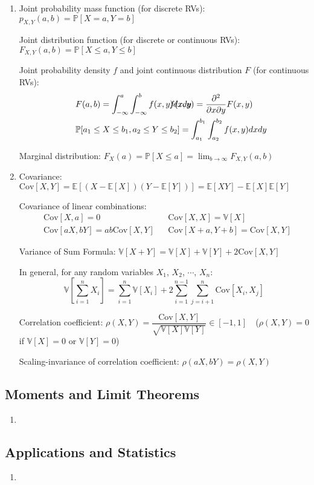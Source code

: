 \documentclass{article}
\begin{document}
\begin{enumerate}
		
	\item Joint probability mass function (for discrete RVs): $p_{X,Y}(a,b)=\mathbb{P}[X=a,Y=b]$
	
		Joint distribution function (for discrete or continuous RVs): $F_{X,Y}(a,b)=\mathbb{P}[X\leq a,Y\leq b]$
		
		Joint probability density $f$ and joint continuous distribution $F$ (for continuous RVs):
		\begin{align*}
			&F(a,b)=\int_{-\infty}^{a}\int_{-\infty}^{b}f(x,y)dxdy &&\hspace*{-4.4cm}f(x,y)=\frac{\partial^2}{\partial x\partial y}F(x,y) \\
			&\mathbb{P}[a_1\leq X\leq b_1, a_2\leq Y\leq b_2]=\int_{a_1}^{b_1}\int_{a_2}^{b_2}f(x,y)dxdy
		\end{align*}
		
		Marginal distribution: $F_X(a)=\mathbb{P}[X\leq a]=\displaystyle\lim_{b\to\infty}F_{X,Y}(a,b)$
	
	\item Covariance: $\mathrm{Cov}[X,Y]=\mathbb{E}\left[(X-\mathbb{E}[X])(Y-\mathbb{E}[Y])\right]=\mathbb{E}[XY]-\mathbb{E}[X]\mathbb{E}[Y]$
		
		Covariance of linear combinations:
		\begin{align*}
			&\mathrm{Cov}[X,a]=0 &&\mathrm{Cov}[X,X]=\mathbb{V}[X] \\
			&\mathrm{Cov}[aX,bY]=ab\mathrm{Cov}[X,Y] &&\mathrm{Cov}[X+a,Y+b]=\mathrm{Cov}[X,Y]
		\end{align*}
		
		Variance of Sum Formula: $\mathbb{V}[X+Y]=\mathbb{V}[X]+\mathbb{V}[Y]+2\mathrm{Cov}[X,Y]$
		
		In general, for any random variables $X_1$, $X_2$, $\cdots$, $X_n$:
		$$\mathbb{V}\left[\sum_{i=1}^{n}X_i\right]=\sum_{i=1}^{n}\mathbb{V}[X_i]+2\sum_{i=1}^{n-1}\sum_{j=i+1}
		^{n}\mathrm{Cov}[X_i,X_j]$$
		
		Correlation coefficient: $\rho(X,Y)=\dfrac{\mathrm{Cov}[X,Y]}{\sqrt{\mathbb{V}[X]\mathbb{V}[Y]}}\in[-1,1]$\ \ ($\rho(X,Y)=0$ if $\mathbb{V}[X]=0$ or $\mathbb{V}[Y]=0$)
		
		Scaling-invariance of correlation coefficient: $\rho(aX,bY)=\rho(X,Y)$
	
\end{enumerate}

\subsection{Moments and Limit Theorems}

\begin{enumerate}
	\item 
\end{enumerate}

\subsection{Applications and Statistics}

\begin{enumerate}
	\item 
\end{enumerate}
\end{document}
